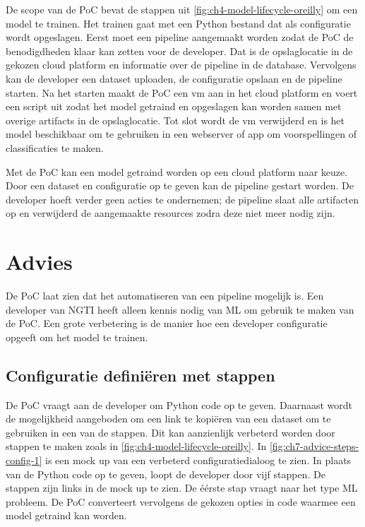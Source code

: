 De scope van de PoC bevat de stappen uit \autoref{fig:ch4-model-lifecycle-oreilly} om een model te trainen. Het trainen gaat met een Python bestand dat als configuratie wordt opgeslagen. Eerst moet een pipeline aangemaakt worden zodat de PoC de benodigdheden klaar kan zetten voor de developer. Dat is de opslaglocatie in de gekozen cloud platform en informatie over de pipeline in de database. Vervolgens kan de developer een dataset uploaden, de configuratie opslaan en de pipeline starten. Na het starten maakt de PoC een \acrshort{vm} aan in het cloud platform en voert een script uit zodat het model getraind en opgeslagen kan worden samen met overige \glspl{artifact} in de opslaglocatie. Tot slot wordt de \acrshort{vm} verwijderd en is het model beschikbaar om te gebruiken in een webserver of app om voorspellingen of classificaties te maken.

Met de PoC kan een model getraind worden op een cloud platform naar keuze. Door een dataset en configuratie op te geven kan de pipeline gestart worden. De developer hoeft verder geen acties te ondernemen; de pipeline slaat alle artifacten op en verwijderd de aangemaakte resources zodra deze niet meer nodig zijn.

\section{Advies}\label{sec:ch7-advies}
De PoC laat zien dat het automatiseren van een pipeline mogelijk is. Een developer van NGTI heeft alleen kennis nodig van ML om gebruik te maken van de PoC. Een grote verbetering is de manier hoe een developer configuratie opgeeft om het model te trainen.


\subsection{Configuratie definiëren met stappen}\label{subsec:ch7-configuratie-definieren-met-stappen}
De PoC vraagt aan de developer om Python code op te geven. Daarnaast wordt de mogelijkheid aangeboden om een link te kopiëren van een dataset om te gebruiken in een van de stappen. Dit kan aanzienlijk verbeterd worden door stappen te maken zoals in \autoref{fig:ch4-model-lifecycle-oreilly}. In \autoref{fig:ch7-advice-steps-config-1} is een mock up van een verbeterd configuratiedialoog te zien. In plaats van de Python code op te geven, loopt de developer door vijf stappen. De stappen zijn links in de mock up te zien. De éérste stap vraagt naar het type ML probleem. De PoC converteert vervolgens de gekozen opties in code waarmee een model getraind kan worden.


